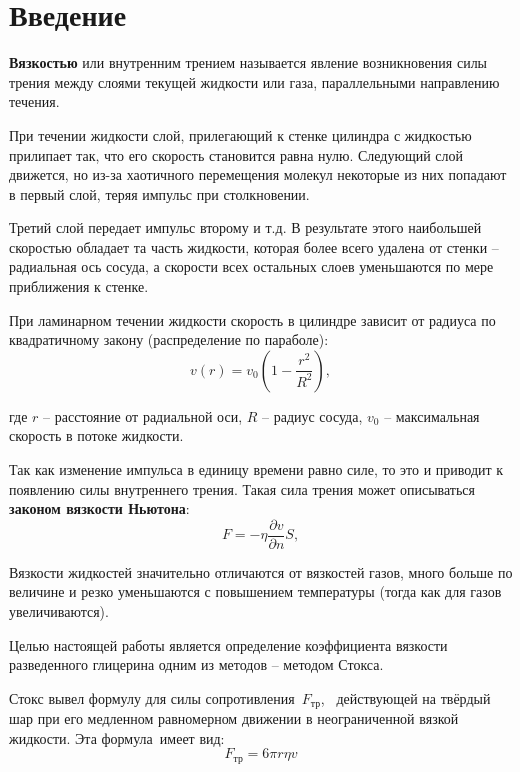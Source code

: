 \documentclass[a4paper,12pt]{article}
\begin{document}


\tableofcontents
\newpage

\section*{Введение} %
\label{sec:input}

\textbf{Вязкостью} или внутренним трением называется явление возникновения силы трения между слоями текущей 
жидкости или газа, параллельными направлению течения. 

При течении жидкости слой, прилегающий к стенке цилиндра с жидкостью прилипает так, что его скорость становится равна нулю. Следующий слой движется, но из-за хаотичного перемещения молекул некоторые из них попадают в первый слой, теряя импульс при столкновении. 

Третий слой передает импульс второму и т.д. В результате этого наибольшей скоростью обладает та часть жидкости, которая более всего удалена от  стенки -- радиальная ось сосуда, а скорости всех остальных слоев уменьшаются по мере приближения к стенке.

При ламинарном течении жидкости скорость в цилиндре зависит от радиуса по квадратичному закону (распределение по параболе):
\begin{equation}
	v(r)=v_0(1- \frac{r^2}{R^2}),
\end{equation}

где $r$ -- расстояние от радиальной оси, $R$ -- радиус сосуда, $v_0$ -- максимальная скорость в потоке жидкости.

Так как изменение импульса в единицу времени равно силе, то это и приводит к появлению силы внутреннего трения. Такая сила трения может описываться \textbf{законом вязкости Ньютона}:
\begin{equation}
	F = - \eta \frac{\partial v}{\partial n}S,
\end{equation}

Вязкости жидкостей значительно отличаются от вязкостей газов, много больше по величине и резко уменьшаются с повышением 
температуры (тогда как для газов увеличиваются). 

Целью настоящей работы является определение  коэффициента вязкости разведенного глицерина одним из методов -- методом Стокса.

Стокс вывел формулу для силы сопротивления $F_\text{тр}$,  действующей на твёрдый шар при его медленном равномерном движении в неограниченной вязкой жидкости. Эта формула имеет вид:
\begin{equation}
	F_\text{тр} = 6{\pi}r{\eta}v
\end{equation}
\end{document}
